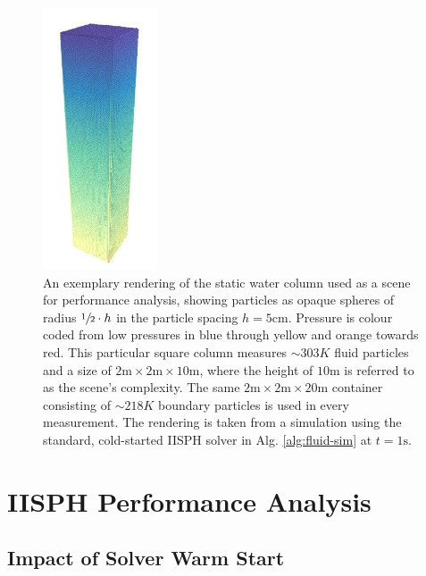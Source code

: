 \documentclass[oneside, a4paper]{book}
\begin{document}
    \begin{figure}
      \centering
      \includegraphics[width=0.3\textwidth]{images/water_column_10m.png}
      \caption{An exemplary rendering of the static water column used as a scene for performance analysis, showing particles as opaque spheres of radius $\sfrac{1}{2}\cdot h$ in the particle spacing $h=5\text{cm}$. Pressure is colour coded from low pressures in blue through yellow and orange towards red. This particular square column measures $\sim 303K$ fluid particles and a size of $2\text{m}\times 2\text{m}\times 10\text{m}$, where the height of $10\text{m}$ is referred to as the scene's complexity. The same $2\text{m}\times 2\text{m}\times 20\text{m}$ container consisting of $\sim 218K$ boundary particles is used in every measurement. The rendering is taken from a simulation using the standard, cold-started IISPH solver in Alg. \ref{alg:fluid-sim} at $t=1\text{s}$.}
      \label{fig:water-column-analysis}
    \end{figure}

    \section{IISPH Performance Analysis}
      \subsection{Impact of Solver Warm Start}
      
\end{document}

